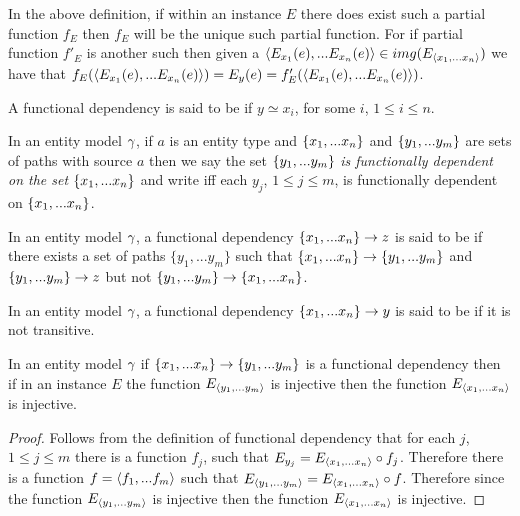 \begin{remark}
In the above definition, if within an instance $E$ there does exist such a partial function $f_E$ then $f_E$ will be the unique such partial function. For if partial function $f'_E$ is another such then given a $\langle E_{x_1}(e),...E_{x_n}(e)\rangle \in img(E_{\langle x_1,...x_n\rangle})$
we have that $f_E(\langle E_{x_1}(e),...E_{x_n}(e)\rangle)=E_y(e)=f'_E(\langle E_{x_1}(e),...E_{x_n}(e)\rangle)$.
\end{remark}

\begin{definition}
A functional dependency  is said to be  if $y\simeq x_i$, for some $i$, $1 \leq i \leq n$.
\end{definition}

\begin{definition}
In an entity model $\gamma$, if
$a$ is an entity type and $\left\{x_1,...x_n\right\}$ and $\left\{y_1,...y_m\right\}$ are sets of paths with source $a$
then we say the set $\left\{y_1,...y_m\right\}$ \textit{is functionally dependent on the set} $\left\{x_1,...x_n\right\}$ and write
iff  each $y_j$, $1 \leq j \leq m$, is functionally dependent on $\left\{x_1,...x_n\right\}$.
\end{definition}
\begin{definition} %
In an entity model $\gamma$, a functional dependency $\left\{x_1,...x_n\right\} \rightarrow z$
is said to be  if there exists a set of paths $\{y_1,...y_{m}\}$ such that
$\left\{x_1,...x_n\right\} \rightarrow \left\{y_1,...y_{m}\right\}$ and $\left\{y_1,...y_{m}\right\} \rightarrow z$ but not
$\{y_1,...y_{m}\} \rightarrow \{x_1,...x_n\}$.
\end{definition}
\begin{definition} %
In an entity model $\gamma$, a functional dependency $\left\{x_1,...x_n\right\} \rightarrow y$
is said to be  if it is not transitive.
\end{definition} 
\begin{lemma}
\label{transitiveinjectivelemma}
In an entity model $\gamma$ if $\left\{x_1,...x_n\right\} \rightarrow \left\{y_1,...y_{m}\right\}$ is a functional dependency then if in an instance $E$ the function $E_{\langle y_1,...y_{m}\rangle}$ is injective then the function $E_{\langle x_1,...x_n\rangle}$  is injective.
\end{lemma}
\begin{proof}
Follows from the definition of functional dependency that for each $j$, $1 \leq j \leq m$  there is a function ${f_j}$,  such that
$E_{y_j}=E_{\langle x_1,...x_n\rangle}\circ f_j$. Therefore there is a function $f=\langle f_1,...f_m\rangle$ such that
$E_{\langle y_1,...y_m\rangle}= E_{\langle x_1,...x_n\rangle}\circ f $. Therefore since  the function $E_{\langle y_1,...y_{m}\rangle}$ is 
injective then the function $E_{\langle x_1,...x_n\rangle}$  is injective.
\end{proof}

